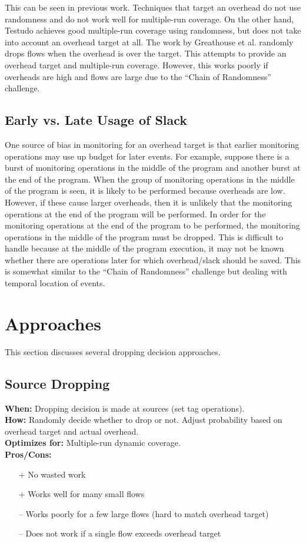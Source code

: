 \documentclass[11pt, letterpaper]{article}
\begin{document}
This can be seen in previous work. Techniques that target an overhead do not
use randomness and do not work well for multiple-run coverage. On the other
hand, Testudo achieves good multiple-run coverage using randomness, but does
not take into account an overhead target at all. The work by Greathouse et al.
randomly drops flows when the overhead is over the target. This attempts to
provide an overhead target and multiple-run coverage. However, this works
poorly if overheads are high and flows are large due to the ``Chain of
Randomness'' challenge.

\subsection{Early vs. Late Usage of Slack}
One source of bias in monitoring for an overhead target is that earlier
monitoring operations may use up budget for later events. For example, suppose
there is a burst of monitoring operations in the middle of the program and
another burst at the end of the program. When the group of monitoring
operations in the middle of the program is seen, it is likely to be performed
because overheads are low. However, if these cause larger overheads, then it is
unlikely that the monitoring operations at the end of the program will be
performed. In order for the monitoring operations at the end of the program to
be performed, the monitoring operations in the middle of the program must be
dropped. This is difficult to handle because at the middle of the program
execution, it may not be known whether there are operations later for which
overhead/slack should be saved. This is somewhat similar to the ``Chain of
Randomness'' challenge but dealing with temporal location of events.

\section{Approaches}
This section discusses several dropping decision approaches.

\subsection{Source Dropping}
\label{sec:source}
\textbf{When: } Dropping decision is made at sources (set tag operations). \\
\textbf{How: } Randomly decide whether to drop or not. Adjust probability based
on overhead target and actual overhead. \\
\textbf{Optimizes for: } Multiple-run dynamic coverage. \\
\textbf{Pros/Cons: }
\begin{itemize}
  \item[+] No wasted work
  \item[+] Works well for many small flows
  \item[--] Works poorly for a few large flows (hard to match overhead target)
  \item[--] Does not work if a single flow exceeds overhead target
\end{itemize}
\end{document}
